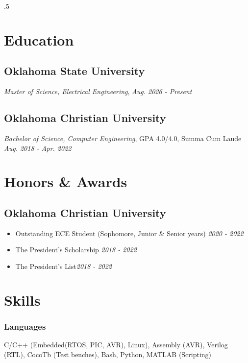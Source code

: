 \documentclass{article}
\begin{document}
\begin{spacing}{.5}

\section{Education}
	\subsection{Oklahoma State University}
		\hspace*{.35cm} \textit{Master of Science, Electrical Engineering}, \hfill \small{\textsl{Aug. 2026 - Present}}
	\subsection{Oklahoma Christian University}
		\hspace*{.35cm} \textit{Bachelor of Science, Computer Engineering}, GPA 4.0/4.0, Summa Cum Laude \hfill \small{\textsl{Aug. 2018 - Apr. 2022}}

\section{Honors \& Awards}
	\subsection{Oklahoma Christian University}
		\begin{itemize}[label=$\bullet$,itemsep=-.35ex]
			\item \large{Outstanding ECE Student}\small{ (Sophomore, Junior \& Senior years)} \hfill \small{\textsl{2020 - 2022}}
			\item \large{The President's Scholarship} \hfill \small{\textsl{2018 - 2022}}
			\item \large{The President's List}\hfill \small{\textsl{2018 - 2022}}
		\end{itemize}

\section{Skills}
		\subsubsection{Languages} \large{\hspace*{2pt} C/C++} \small{(Embedded(RTOS, PIC, AVR), Linux)}\large{, Assembly} \small{(AVR), } \large{Verilog} \small{(RTL), } \large{CocoTb} \small{(Test benches), }\large{Bash,}\large{ Python,}\large{ MATLAB} \small{(Scripting)}

\end{spacing}
\end{document}
